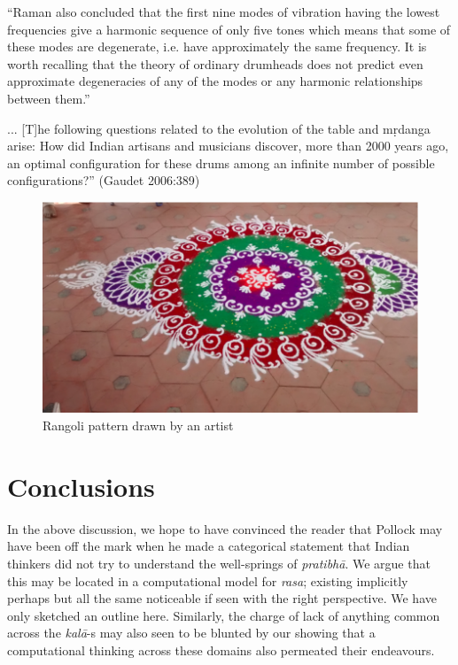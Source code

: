 \begin{myquote}
“Raman also concluded that the first nine modes of vibration having the lowest frequencies give a harmonic sequence of only five tones which means that some of these modes are degenerate, i.e. have approximately the same frequency. It is worth recalling that the theory of ordinary drumheads does not predict even approximate degeneracies of any of the modes or any harmonic relationships between them.” 

... [T]he following questions related to the evolution of the table and mṛdanga arise: How did Indian artisans and musicians discover, more than 2000 years ago, an optimal configuration for these drums among an infinite number of possible configurations?” 
\hfill (Gaudet 2006:389)
\end{myquote}
\begin{figure}[H]
\centering
\includegraphics[scale=.75]{figures/8.eps}
\caption{Rangoli pattern drawn by an artist}\label{chap3-fig6}
\end{figure}

\section{Conclusions}\label{chap3-sec6}

In the above discussion, we hope to have convinced the reader that Pollock may have been off the mark when he made a categorical statement that Indian thinkers did not try to understand the well-springs of \textsl{pratibhā}. We argue that this may be located in a computational model for \textsl{rasa}; existing implicitly perhaps but all the same noticeable if seen with the right perspective. We have only sketched an outline here. Similarly, the charge of lack of anything common across the \textsl{kalā}-s may also seen to be blunted by our showing that a computational thinking across these domains also permeated their endeavours.\\[-21pt]

